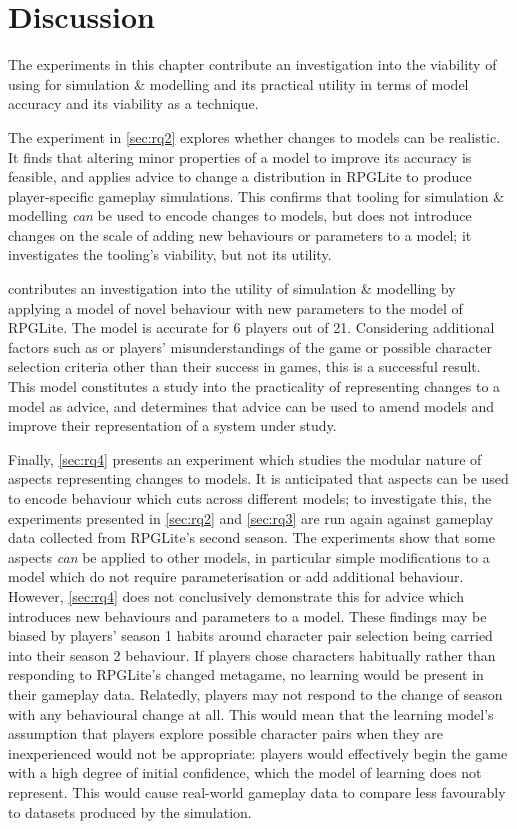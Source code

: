 \section{Discussion}
\label{experiment_results_final_discussion}

The experiments in this chapter contribute an investigation into the
viability of using \aop for simulation \& modelling and its practical utility
in terms of model accuracy and its viability as a technique.

The experiment in \cref{sec:rq2} explores whether \aspectoriented{} changes to
models can be realistic. It finds that altering minor properties of a model to
improve its accuracy is feasible, and applies advice to change a distribution in
RPGLite to produce player-specific gameplay simulations. This confirms that
\aspectoriented{} tooling for simulation \& modelling \emph{can} be used to
encode changes to models, but does not introduce changes on the scale of adding
new behaviours or parameters to a model; it investigates the tooling's
viability, but not its utility.

 contributes an investigation into the utility of
\aspectoriented{} simulation \& modelling by applying a model of novel behaviour
with new parameters to the model of RPGLite. The model is accurate for 6 players
out of 21. Considering additional factors such as or players' misunderstandings
of the game or possible character selection criteria other than their success in
games, this is a successful result. This model constitutes a study into the
practicality of representing changes to a model as advice, and determines that
advice can be used to amend models and improve their representation of a system
under study.

Finally, \cref{sec:rq4} presents an experiment which studies the modular nature
of aspects representing changes to models. It is anticipated that aspects can be
used to encode behaviour which cuts across different models; to investigate
this, the experiments presented in \cref{sec:rq2} and \cref{sec:rq3} are run
again against gameplay data collected from RPGLite's second season. The
experiments show that some aspects \emph{can} be applied to other models, in
particular simple modifications to a model which do not require parameterisation
or add additional behaviour. However, \cref{sec:rq4} does not conclusively
demonstrate this for advice which introduces new behaviours and parameters to a
model. These findings may be biased by players' season 1 habits around character
pair selection being carried into their season 2 behaviour. If players chose
characters habitually rather than responding to RPGLite's changed metagame, no
learning would be present in their gameplay data. Relatedly, players may not
respond to the change of season with any behavioural change at all. This would
mean that the learning model's assumption that players explore possible
character pairs when they are inexperienced would not be appropriate: players
would effectively begin the game with a high degree of initial confidence, which
the model of learning does not represent. This would cause real-world gameplay
data to compare less favourably to datasets produced by the simulation.

